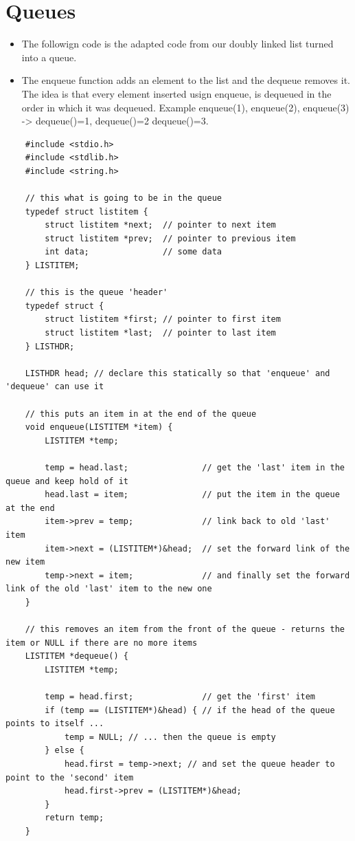 \section{Queues}
\begin{itemize}
    \item The followign code is the adapted code from our doubly linked list turned into a queue. 
    \item The enqueue function adds an element to the list and the dequeue removes it. The idea is that every element inserted usign enqueue, is dequeued in the order in which it was dequeued. Example enqueue(1), enqueue(2), enqueue(3) -> dequeue()=1, dequeue()=2 dequeue()=3.
\end{itemize}
\begin{verbatim}
    #include <stdio.h>
    #include <stdlib.h>
    #include <string.h>

    // this what is going to be in the queue
    typedef struct listitem {
        struct listitem *next;  // pointer to next item
        struct listitem *prev;  // pointer to previous item
        int data;		        // some data
    } LISTITEM;

    // this is the queue 'header'
    typedef struct {
        struct listitem *first;	// pointer to first item
        struct listitem *last;	// pointer to last item
    } LISTHDR;

    LISTHDR head; // declare this statically so that 'enqueue' and 'dequeue' can use it

    // this puts an item in at the end of the queue
    void enqueue(LISTITEM *item) {
        LISTITEM *temp;

        temp = head.last;				// get the 'last' item in the queue and keep hold of it
        head.last = item;				// put the item in the queue at the end
        item->prev = temp;				// link back to old 'last' item
        item->next = (LISTITEM*)&head;	// set the forward link of the new item
        temp->next = item;				// and finally set the forward link of the old 'last' item to the new one
    }

    // this removes an item from the front of the queue - returns the item or NULL if there are no more items
    LISTITEM *dequeue() {
        LISTITEM *temp;

        temp = head.first;				// get the 'first' item
        if (temp == (LISTITEM*)&head) {	// if the head of the queue points to itself ...
            temp = NULL; // ... then the queue is empty 			
        } else {
            head.first = temp->next; // and set the queue header to point to the 'second' item
            head.first->prev = (LISTITEM*)&head;
        }
        return temp;
    }


\end{verbatim}
